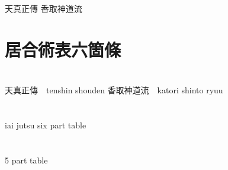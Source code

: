 \documentclass[dvipdfmx, a4paper, 12pt]{utarticle}
\begin{document}
\begin{CJK*}{UTF8}{min}
\CJKtilde
\begin{landscape}

\newpage
\pagestyle{empty}
天真正傳
香取神道流
\section{居合術表六箇條}

\newpage
\pagestyle{empty}
\section{}

\newpage
\pagestyle{empty}
天真正傳　tenshin shouden
香取神道流　katori shinto ryuu

\newpage
\pagestyle{empty}
\section{}
iai jutsu six part table
\section{}
5 part table

\end{landscape}
\end{CJK*}
\end{document}

